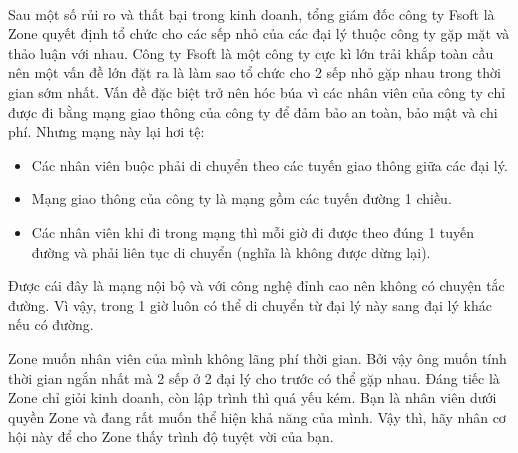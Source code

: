  

Sau một số rủi ro và thất bại trong kinh doanh, tổng giám đốc công ty Fsoft là Zone quyết định tổ chức cho các sếp nhỏ của các đại lý thuộc công ty gặp mặt và thảo luận với nhau. Công ty Fsoft là một công ty cực kì lớn trải khắp toàn cầu nên một vấn đề lớn đặt ra là làm sao tổ chức cho 2 sếp nhỏ gặp nhau trong thời gian sớm nhất. Vấn đề đặc biệt trở nên hóc búa vì các nhân viên của công ty chỉ được đi bằng mạng giao thông của công ty để đảm bảo an toàn, bảo mật và chi phí. Nhưng mạng này lại hơi tệ:
\begin{itemize}
	\item Các nhân viên buộc phải di chuyển theo các tuyến giao thông giữa các đại lý.
	\item Mạng giao thông của công ty là mạng gồm các tuyến đường 1 chiều.
	\item Các nhân viên khi đi trong mạng thì mỗi giờ đi được theo đúng 1 tuyến đường và phải liên tục di chuyển (nghĩa là không được dừng lại).
\end{itemize}

Được cái đây là mạng nội bộ và với công nghệ đỉnh cao nên không có chuyện tắc đường. Vì vậy, trong 1 giờ luôn có thể di chuyển từ đại lý này sang đại lý khác nếu có đường.

Zone muốn nhân viên của mình không lãng phí thời gian. Bởi vậy ông muốn tính thời gian ngắn nhất mà 2 sếp ở 2 đại lý cho trước có thể gặp nhau. Đáng tiếc là Zone chỉ giỏi kinh doanh, còn lập trình thì quá yếu kém. Bạn là nhân viên dưới quyền Zone và đang rất muốn thể hiện khả năng của mình. Vậy thì, hãy nhân cơ hội này để cho Zone thấy trình độ tuyệt vời của bạn.

\